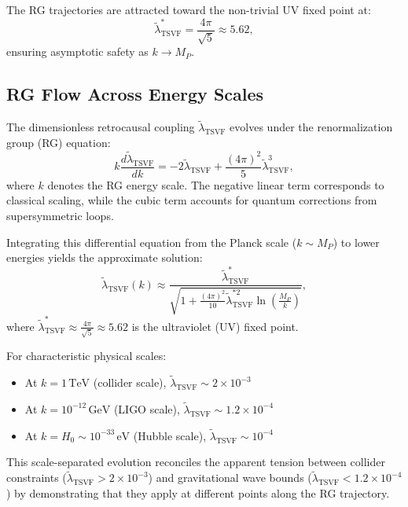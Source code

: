 \documentclass[twocolumn,superscriptaddress,floatfix]{revtex4-2}
\begin{document}
The RG trajectories are attracted toward the non-trivial UV fixed point at:
\begin{equation}
\tilde{\lambda}_{\text{TSVF}}^* = \frac{4\pi}{\sqrt{5}} \approx 5.62,
\end{equation}
ensuring asymptotic safety as \(k \to M_P\).

\subsection{RG Flow Across Energy Scales}  
\label{subsec:RG_flow}  

The dimensionless retrocausal coupling \(\tilde{\lambda}_{\text{TSVF}}\) evolves under the renormalization group (RG) equation:
\begin{equation}  
k\frac{d\tilde{\lambda}_{\text{TSVF}}}{dk} = -2\tilde{\lambda}_{\text{TSVF}} + \frac{(4\pi)^2}{5}\tilde{\lambda}_{\text{TSVF}}^3,  
\end{equation}  
where \(k\) denotes the RG energy scale. The negative linear term corresponds to classical scaling, while the cubic term accounts for quantum corrections from supersymmetric loops.

Integrating this differential equation from the Planck scale (\(k \sim M_P\)) to lower energies yields the approximate solution:
\begin{equation}  
\tilde{\lambda}_{\text{TSVF}}(k) \approx \frac{\tilde{\lambda}_{\text{TSVF}}^*}{\sqrt{1 + \frac{(4\pi)^2}{10} \tilde{\lambda}_{\text{TSVF}}^{*2} \ln\left(\frac{M_P}{k}\right)}},  
\end{equation}  
where \(\tilde{\lambda}_{\text{TSVF}}^* \approx \frac{4\pi}{\sqrt{5}} \approx 5.62\) is the ultraviolet (UV) fixed point.

For characteristic physical scales:
\begin{itemize}
    \item At \(k = 1\,\text{TeV}\) (collider scale), \(\tilde{\lambda}_{\text{TSVF}} \sim 2 \times 10^{-3}\)
    \item At \(k = 10^{-12}\,\text{GeV}\) (LIGO scale), \(\tilde{\lambda}_{\text{TSVF}} \sim 1.2 \times 10^{-4}\)
    \item At \(k = H_0 \sim 10^{-33}\,\text{eV}\) (Hubble scale), \(\tilde{\lambda}_{\text{TSVF}} \sim 10^{-4}\)
\end{itemize}

This scale-separated evolution reconciles the apparent tension between collider constraints (\(\tilde{\lambda}_{\text{TSVF}} > 2 \times 10^{-3}\)) and gravitational wave bounds (\(\tilde{\lambda}_{\text{TSVF}} < 1.2 \times 10^{-4}\)) by demonstrating that they apply at different points along the RG trajectory.
\end{document}
